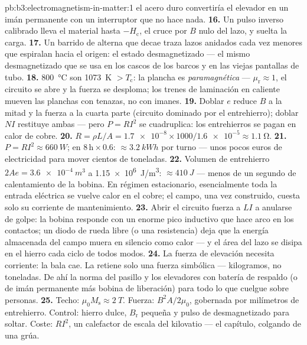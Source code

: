 \begin{solution}{pb:b3:electromagnetism-in-matter:1}
el acero duro convertiría el elevador en un imán permanente con un
interruptor que no hace nada.
\textbf{16.} Un pulso inverso calibrado lleva el material hasta
$-H_{\text{c}}$, el cruce por $B$ nulo del lazo, y suelta la
carga.
\textbf{17.} Un barrido de alterna que decae traza lazos anidados cada vez menores
que espiralan hacia el origen: el estado desmagnetizado --- el mismo
desmagnetizado que se usa en los cascos de los barcos y en las viejas pantallas de tubo.
\textbf{18.} \qty{800}{\celsius} son \qty{1073}{K} $> T_{\text{c}}$:
la plancha es \emph{paramagnética} --- $\mu_{\text{r}} \approx 1$,
el circuito se abre y la fuerza se desploma; los trenes de laminación en caliente mueven las planchas con
tenazas, no con imanes.
\textbf{19.} Doblar $e$ reduce $B$ a la mitad y la fuerza a la cuarta parte
(circuito dominado por el entrehierro); doblar $NI$ restituye ambas --- pero
$P = RI^2$ se cuadruplica: los entrehierros se pagan en calor de cobre.
\textbf{20.} $R = \rho L/A = \num{1.7e-8}\times1000/
\num{1.6e-5} \approx \qty{1.1}{\ohm}$.
\textbf{21.} $P = RI^2 \approx \qty{660}{W}$; en
$8\,\text{h}\times0.6$: $\approx\qty{3.2}{kWh}$ por turno ---
unos pocos euros de electricidad para mover cientos de toneladas.
\textbf{22.} Volumen de entrehierro $2Ae = \qty{3.6e-4}{m^3}$ a
\qty{1.15e6}{J/m^3}: $\approx\qty{410}{J}$ --- menos de un
segundo de calentamiento de la bobina. En régimen estacionario, esencialmente toda la entrada
eléctrica se vuelve calor en el cobre; el campo, una vez construido, cuesta solo su
corriente de mantenimiento.
\textbf{23.} Abrir el circuito fuerza a $LI$ a anularse de golpe:
la bobina responde con un enorme pico inductivo que hace arco en los
contactos; un diodo de rueda libre (o una resistencia) deja que la energía almacenada del campo
muera en silencio como calor --- y el área del lazo se disipa
en el hierro cada ciclo de todos modos.
\textbf{24.} La fuerza de elevación necesita corriente: la bala cae.
La  retiene solo una fuerza simbólica --- kilogramos, no toneladas.
De ahí la norma del pasillo y los elevadores con batería de respaldo (o de imán
permanente más bobina de liberación) para todo lo que cuelgue sobre personas.
\textbf{25.} Techo: $\mu_0M_{\text{s}} \approx \qty{2}{T}$.
Fuerza: $B^2A/2\mu_0$, gobernada por milímetros de entrehierro. Control:
hierro dulce, $B_{\text{r}}$ pequeña y pulso de desmagnetizado para soltar. Coste:
$RI^2$, un calefactor de escala del kilovatio --- el capítulo, colgando de una
grúa.
\end{solution}
